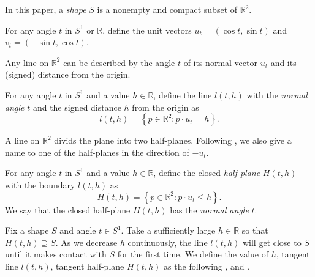 \begin{definition}

In this paper, a \emph{shape} \(S\) is a nonempty and compact subset of \(\mathbb{R}^2\).

\label{def:shape}
\end{definition}

\begin{definition}

For any angle \(t\) in \(S^1\) or \(\mathbb{R}\), define the unit vectors \(u_t = \left( \cos t, \sin t \right)\) and \(v_t = \left( -\sin t,\cos t \right)\).

\label{def:frame}
\end{definition}

Any line on \(\mathbb{R}^2\) can be described by the angle \(t\) of its normal vector \(u_t\) and its (signed) distance from the origin.

\begin{definition}

For any angle \(t\) in \(S^1\) and a value \(h \in \mathbb{R}\), define the line \(l(t, h)\) with the \emph{normal angle} \(t\) and the signed distance \(h\) from the origin as
\[
l(t, h) = \left\{ p \in \mathbb{R}^2 : p \cdot u_t = h \right\}.
\]

\label{def:line}
\end{definition}

A line on \(\mathbb{R}^2\) divids the plane into two half-planes. Following , we also give a name to one of the half-planes in the direction of \(-u_t\).

\begin{definition}

For any angle \(t\) in \(S^1\) and a value \(h \in \mathbb{R}\), define the closed \emph{half-plane} \(H(t, h)\) with the boundary \(l(t, h)\) as
\[
H(t, h) = \left\{ p \in \mathbb{R}^2 : p \cdot u_t \leq h \right\}.
\]
We say that the closed half-plane \(H(t, h)\) has the \emph{normal angle} \(t\).

\label{def:half-plane}
\end{definition}

Fix a shape \(S\) and angle \(t \in S^1\). Take a sufficiently large \(h \in \mathbb{R}\) so that \(H(t, h) \supseteq S\). As we decrease \(h\) continuously, the line \(l(t, h)\) will get close to \(S\) until it makes contact with \(S\) for the first time. We define the value of \(h\), tangent line \(l(t, h)\), tangent half-plane \(H(t, h)\) as the following ,  and .

